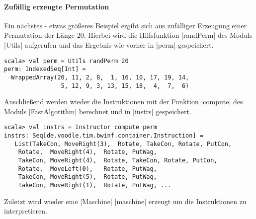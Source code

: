 \paragraph{Zufällig erzeugte Permutation}
Ein nächstes - etwas größeres Beispiel ergibt sich aus zufälliger Erzeugung einer Permutation der Länge 20.
Hierbei wird die Hilfsfunktion |randPerm| des Moduls |Utils| aufgerufen und das Ergebnis wie vorher in |perm| gespeichert.
\begin{lstlisting}
scala> val perm = Utils randPerm 20
perm: IndexedSeq[Int] =
  WrappedArray(20, 11, 2, 8,  1, 16, 10, 17, 19, 14,
                5, 12, 9, 3, 13, 15, 18,  4,  7,  6)
\end{lstlisting}
Anschließend werden wieder die Instruktionen mit der Funktion |compute| des Moduls |FastAlgorithm| berechnet und in |instrs| gespeichert.
\begin{lstlisting}
scala> val instrs = Instructor compute perm
instrs: Seq[de.voodle.tim.bwinf.container.Instruction] =
   List(TakeCon, MoveRight(3),  Rotate, TakeCon, Rotate, PutCon,
	Rotate,  MoveRight(4),  Rotate, PutWag,
	TakeCon, MoveRight(4),  Rotate, TakeCon, Rotate, PutCon,
	Rotate,  MoveLeft(0),   Rotate, PutWag,
	TakeCon, MoveRight(5),  Rotate, PutWag,
	TakeCon, MoveRight(1),  Rotate, PutWag, ...
\end{lstlisting}
Zuletzt wird wieder eine |Maschine| |maschine| erzeugt um die Instruktionen zu interpretieren.
